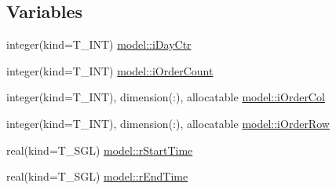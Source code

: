 \subsection*{Variables}
\begin{DoxyCompactItemize}
\item 
integer(kind=T\_\-INT) \hyperlink{namespacemodel_a86a9f30f454de7137945c61f3d8a7a8a}{model::iDayCtr}
\item 
integer(kind=T\_\-INT) \hyperlink{namespacemodel_a6427b836cffd85fb90dd0557e564b4d7}{model::iOrderCount}
\item 
integer(kind=T\_\-INT), dimension(:), allocatable \hyperlink{namespacemodel_ab88058fb18ed4c3a4d26f357e8c4d44d}{model::iOrderCol}
\item 
integer(kind=T\_\-INT), dimension(:), allocatable \hyperlink{namespacemodel_ae02f87fcf1fa7cfc9b55189633ae7f47}{model::iOrderRow}
\item 
real(kind=T\_\-SGL) \hyperlink{namespacemodel_af6e6b71a83c27f7935909506664b8c8f}{model::rStartTime}
\item 
real(kind=T\_\-SGL) \hyperlink{namespacemodel_a0543ca4ff4a5abe0454b315150c96261}{model::rEndTime}
\end{DoxyCompactItemize}
